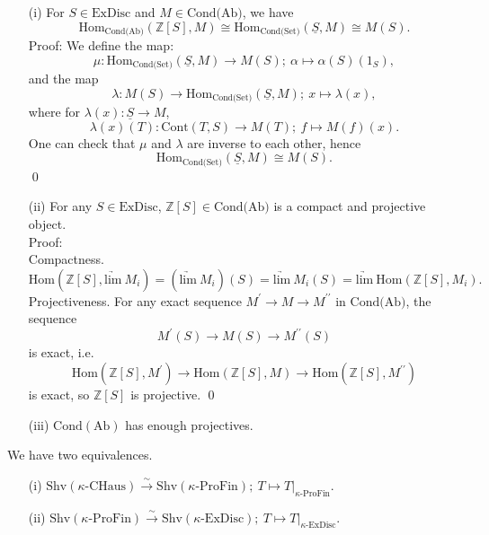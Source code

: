 \documentclass[UTF8,12,a4paper]{ctexart}
\theoremstyle{definition}
\begin{document}
\rem 
\begin{itemize}
	\item [(i)] For $S\in \text{ExDisc}$ and $M\in\text{Cond(Ab)}$, we have 
	$$\text{Hom}_{\text{Cond(Ab)}}(\mathbb{Z}[S],M)\cong \text{Hom}_{\text{Cond(Set)}}(\underline{S},M)\cong  M(S).$$
	Proof: We define the map:
	$$
	\mu:\text{Hom}_{\text{Cond(Set)}}(\underline{S},M)\longrightarrow M(S);\ \alpha\mapsto \alpha(S)(1_S),
	$$
	and the map
	$$
	\lambda:M(S)\longrightarrow \text{Hom}_{\text{Cond(Set)}}(\underline{S},M);\ x\mapsto \lambda(x),
	$$ where for $\lambda(x): \underline{S}\longrightarrow M$, 
	$$
	\lambda(x)(T): \text{Cont}(T,S)\longrightarrow M(T);\ f\mapsto M(f)(x).
	$$
	One can check that $\mu$ and $\lambda$ are inverse to each other, hence
	$$\text{Hom}_{\text{Cond(Set)}}(\underline{S},M)\cong  M(S).$$
	\qed
	
	
	
	\item [(ii)] For any $S\in \text{ExDisc}$, $\mathbb{Z}[S]\in \text{Cond(Ab)}$ is a compact and projective object.\\
	Proof:\\ 
	Compactness.
	$$
	\text{Hom}(\mathbb{Z}[S],\underrightarrow{\text{lim}}\ M_i)=(\underrightarrow{\text{lim}}\ M_i)(S)=\underrightarrow{\text{lim}}\ M_i(S)=\underrightarrow{\text{lim}}\ \text{Hom}(\mathbb{Z}[S],M_i).
	$$
	Projectiveness. For any exact sequence $M^\prime\rightarrow M\rightarrow M^{\prime\prime}$ in $\text{Cond(Ab)}$, the sequence
	$$M^\prime(S)\rightarrow M(S) \rightarrow M^{\prime\prime}(S)$$
	is exact, i.e.
	$$
	\text{Hom}(\mathbb{Z}[S], M^\prime)\rightarrow\text{Hom}(\mathbb{Z}[S], M)\rightarrow\text{Hom}(\mathbb{Z}[S], M^{\prime\prime})
	$$ is exact, so $\mathbb{Z}[S]$ is projective.
	\qed
	\item [(iii)]
	$\text{Cond}(\text{Ab})$ has enough projectives.
\end{itemize}






\prop 
We have two equivalences.
\begin{itemize}
	\item [(i)]$\text{Shv}(\kappa\text{-CHaus})\stackrel{\sim}{\longrightarrow}\text{Shv}(\kappa\text{-ProFin});\ T\mapsto T|_{\kappa\text{-ProFin}}.$
	\item [(ii)]$\text{Shv}(\kappa\text{-ProFin})\stackrel{\sim}{\longrightarrow}\text{Shv}(\kappa\text{-ExDisc});\ T\mapsto T|_{\kappa\text{-ExDisc}}.$
\end{itemize}
\end{document}
